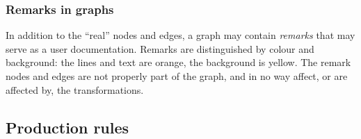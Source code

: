 
\subsubsection{Remarks in graphs}

In addition to the ``real'' nodes and edges, a graph may contain \emph{remarks} 
that may serve as a user documentation. Remarks are distinguished by colour and
background: the lines and text are orange, the background is yellow. The
remark nodes and edges are not properly part of the graph, and in no way
affect, or are affected by, the transformations.

\subsection{Production rules}

